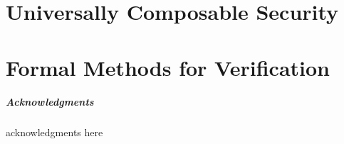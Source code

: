 \documentclass[runningheads,orivec]{llncs}
\date{\today}          %
\def\acknowledgmenttext{
  acknowledgments here
}
\begin{document}


\chapter{Universally Composable Security}

\chapter{Formal Methods for Verification}




\checkfornotes
\ifnum{}
\ifnum{}
\paragraph{Acknowledgments}
\acknowledgmenttext
\fi
\fi
\ifnum{}

\else

\fi
\appendix




\end{document}
